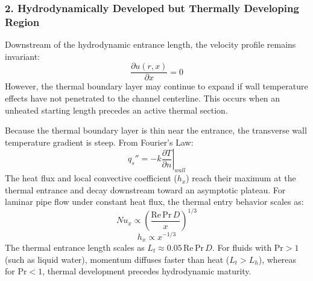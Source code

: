 \documentclass[12pt,a4paper]{report}
\begin{document}
\subsubsection{2. Hydrodynamically Developed but Thermally Developing Region}
Downstream of the hydrodynamic entrance length, the velocity profile remains invariant:
\begin{equation}
\frac{\partial u(r,x)}{\partial x} = 0
\end{equation}
However, the thermal boundary layer may continue to expand if wall temperature effects have not penetrated to the channel centerline. This occurs when an unheated starting length precedes an active thermal section.

Because the thermal boundary layer is thin near the entrance, the transverse wall temperature gradient is steep. From Fourier's Law:
\begin{equation}
q_s'' = -k \left.\frac{\partial T}{\partial n}\right|_{wall}
\end{equation}
The heat flux and local convective coefficient ($h_x$) reach their maximum at the thermal entrance and decay downstream toward an asymptotic plateau. For laminar pipe flow under constant heat flux, the thermal entry behavior scales as:
\begin{equation}
Nu_x \propto \left( \frac{\text{Re}\,\text{Pr}\,D}{x} \right)^{1/3}
\end{equation}
\begin{equation}
h_x \propto x^{-1/3}
\end{equation}
The thermal entrance length scales as $L_t \approx 0.05\,\text{Re}\,\text{Pr}\,D$. For fluids with $\text{Pr} > 1$ (such as liquid water), momentum diffuses faster than heat ($L_t > L_h$), whereas for $\text{Pr} < 1$, thermal development precedes hydrodynamic maturity.
\end{document}
